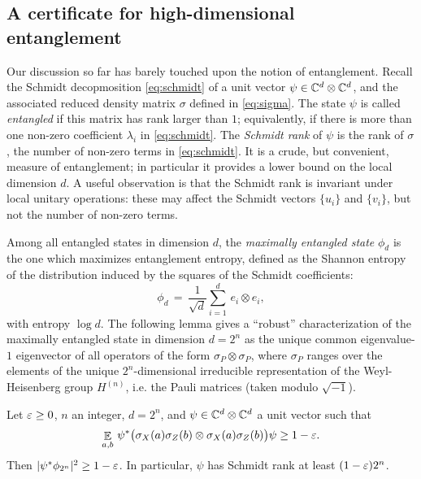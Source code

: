 \subsection{A certificate for high-dimensional entanglement}
\label{subsection-certificate-high-dim-entanglement}

Our discussion so far has barely touched upon the notion of entanglement. Recall the Schmidt decopmosition \eqref{eq:schmidt} of a unit vector $\psi \in \mathbb{C}^d\otimes \mathbb{C}^d$, and the associated reduced density matrix $\sigma$ defined in \eqref{eq:sigma}. The state $\psi$ is called \emph{entangled} if this matrix has rank larger than $1$; equivalently, if there is more than one non-zero coefficient $\lambda_i$ in \eqref{eq:schmidt}. The \emph{Schmidt rank} of $\psi$ is the rank of $\sigma$, the number of non-zero terms in \eqref{eq:schmidt}. It is a crude, but convenient, measure of entanglement; in particular it provides a lower bound on the local dimension $d$. A useful observation is that the Schmidt rank is invariant under local unitary operations: these may affect the Schmidt vectors $\{u_i\}$ and $\{v_i\}$, but not the number of non-zero terms. 



Among all entangled states in dimension $d$, the \emph{maximally entangled state} $\phi_d$ is the one which maximizes entanglement entropy, defined as the Shannon entropy of the distribution induced by the squares of the Schmidt coefficients: 
$$ \phi_d \,=\, \frac{1}{\sqrt{d}} \sum_{i=1}^d\, e_i\otimes e_i,$$
with entropy $\log d$. 
The following lemma gives a ``robust'' characterization of the maximally entangled state in dimension $d=2^n$ as the unique common eigenvalue-$1$ eigenvector of all operators of the form $\sigma_P \otimes \sigma_P$, where $\sigma_P$ ranges over the elements of the unique $2^n$-dimensional irreducible representation of the Weyl-Heisenberg group $H^{(n)}$, i.e. the Pauli matrices (taken modulo $\sqrt{-1}$).

\begin{lemma}\label{lem:sr}
Let $\varepsilon\geq 0$, $n$ an integer, $d=2^n$, and $\psi\in \mathbb{C}^d \otimes \mathbb{C}^d$ a unit vector  such that 
\begin{equation}\label{eq:lem-ass}
 \mathop{\mathbb{E}}\displaylimits_{a,b}\, \psi^* \big(\sigma_X(a) \sigma_Z(b)\otimes \sigma_X(a) \sigma_Z(b) \big) \psi \geq 1-\varepsilon.
\end{equation}
Then $|\psi^*\phi_{2^n}|^2 \geq 1-\varepsilon$. In particular, $\psi$ has Schmidt rank at least $(1-\varepsilon) 2^n$. 
\end{lemma}


